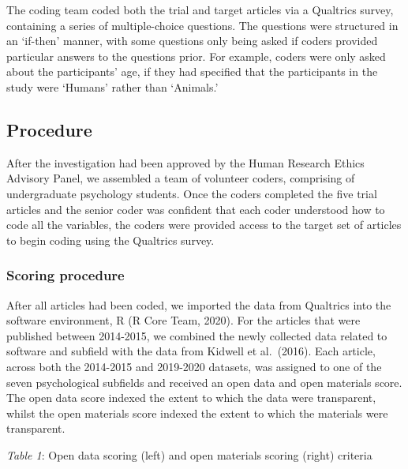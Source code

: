 \documentclass[
  english,
  man,floatsintext]{apa6}
\begin{document}
The coding team coded both the trial and target articles via a Qualtrics survey, containing a series of multiple-choice questions. The questions were structured in an `if-then' manner, with some questions only being asked if coders provided particular answers to the questions prior. For example, coders were only asked about the participants' age, if they had specified that the participants in the study were `Humans' rather than `Animals.'

\hypertarget{procedure}{%
\subsection{Procedure}\label{procedure}}

After the investigation had been approved by the Human Research Ethics Advisory Panel, we assembled a team of volunteer coders, comprising of undergraduate psychology students. Once the coders completed the five trial articles and the senior coder was confident that each coder understood how to code all the variables, the coders were provided access to the target set of articles to begin coding using the Qualtrics survey.

\hypertarget{scoring-procedure}{%
\subsubsection{Scoring procedure}\label{scoring-procedure}}

After all articles had been coded, we imported the data from Qualtrics into the software environment, R (R Core Team, 2020). For the articles that were published between 2014-2015, we combined the newly collected data related to software and subfield with the data from Kidwell et al.~(2016). Each article, across both the 2014-2015 and 2019-2020 datasets, was assigned to one of the seven psychological subfields and received an open data and open materials score. The open data score indexed the extent to which the data were transparent, whilst the open materials score indexed the extent to which the materials were transparent.

\emph{Table 1}: Open data scoring (left) and open materials scoring (right) criteria
\end{document}
